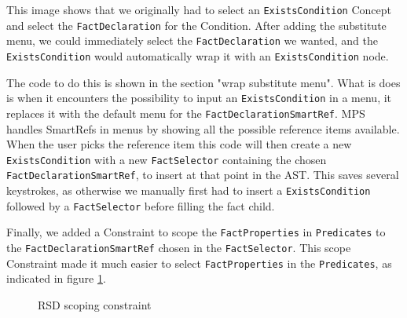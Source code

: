 This image shows that we originally had to select an \texttt{ExistsCondition} Concept and select the \linebreak\texttt{FactDeclaration} for the Condition.
After adding the substitute menu, we could immediately select the \texttt{FactDeclaration} we wanted, and the \texttt{ExistsCondition} would automatically wrap it with an \texttt{ExistsCondition} node.

The code to do this is shown in the section "wrap substitute menu".
What is does is when it encounters the possibility to input an \texttt{ExistsCondition} in a menu, it replaces it with the default menu for the \linebreak\texttt{FactDeclarationSmartRef}.
MPS handles SmartRefs in menus by showing all the possible reference items available.
When the user picks the reference item this code will then create a new \texttt{ExistsCondition} with a new \texttt{FactSelector} containing the chosen \texttt{FactDeclarationSmartRef}, to insert at that point in the AST.
This saves several keystrokes, as otherwise we manually first had to insert a \texttt{ExistsCondition} followed by a \texttt{FactSelector} before filling the fact child.

Finally, we added a Constraint to scope the \texttt{FactProperties} in \texttt{Predicates} to the \texttt{FactDeclarationSmartRef} chosen in the \texttt{FactSelector}.
This scope Constraint made it much easier to select \texttt{FactProperties} in the \linebreak\texttt{Predicates}, as indicated in figure \ref{fig:RSDConstraint}.

\begin{figure}
    \centering
    \caption{RSD scoping constraint}
    \label{fig:RSDConstraint}
\end{figure}

